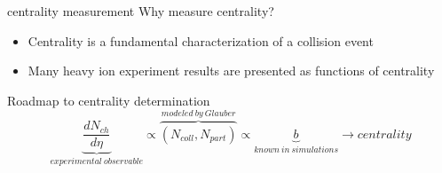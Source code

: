 \documentclass{beamer}
\begin{document}
\begin{frame}{centrality measurement}
Why measure centrality?
\begin{itemize}
  \item Centrality is a fundamental characterization of a collision event
  \item Many heavy ion experiment results are presented as functions of centrality  
\end{itemize}
Roadmap to centrality determination
\begin{equation*}
\underbrace{\frac{dN_{ch}}{d\eta}}_{experimental \: observable} \propto \overbrace{\left( N_{coll}, N_{part} \right)}^{modeled\:by\:Glauber} \propto \underbrace{b}_{known\:in\:simulations}\rightarrow centrality
\end{equation*}
\end{frame}
\end{document}

